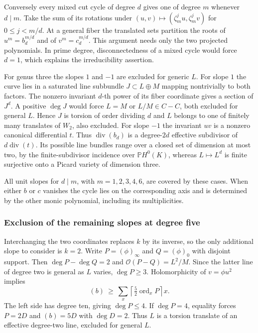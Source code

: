 Conversely every mixed cut cycle of degree $d$ gives one of degree $m$ whenever $d\mid m$. Take the sum of its rotations under $(u,v)\mapsto(\zeta_m^j u,\zeta_m^j v)$ for $0\le j<m/d$. At a general fiber the translated sets partition the roots of $u^m=b_d^{m/d}$ and of $v^m=c_d^{m/d}$. This argument needs only the two projected polynomials. In prime degree, disconnectedness of a mixed cycle would force $d=1$, which explains the irreducibility assertion.

For genus three the slopes $1$ and $-1$ are excluded for generic $L$. For slope $1$ the curve lies in a saturated line subbundle $J\subset L\oplus M$ mapping nontrivially to both factors. The nonzero invariant $d$-th power of its fiber coordinate gives a section of $J^d$. A positive $\deg J$ would force $L=M$ or $L/M\in C-C$, both excluded for general $L$. Hence $J$ is torsion of order dividing $d$ and $L$ belongs to one of finitely many translates of $W_2$, also excluded. For slope $-1$ the invariant $uv$ is a nonzero canonical differential $t$. Thus $\operatorname{div}(b_d)$ is a degree-$2d$ effective subdivisor of $d\operatorname{div}(t)$. Its possible line bundles range over a closed set of dimension at most two, by the finite-subdivisor incidence over $\mathbb P H^0(K)$, whereas $L\mapsto L^d$ is finite surjective onto a Picard variety of dimension three.  

All unit slopes for $d\mid m$, with $m=1,2,3,4,6$, are covered by these cases. When either $b$ or $c$ vanishes the cycle lies on the corresponding axis and is determined by the other monic polynomial, including its multiplicities.

\subsubsection{Exclusion of the remaining slopes at degree five}

Interchanging the two coordinates replaces $k$ by its inverse, so the only additional slope to consider is $k=2$. Write $P=(\phi)_\infty$ and $Q=(\phi)_0$ with disjoint support. Then $\deg P-\deg Q=2$ and $\mathcal O(P-Q)=L^2/M$. Since the latter line of degree two is general as $L$ varies, $\deg P\ge3$. Holomorphicity of $v=\phi u^2$ implies
\[
 (b)\ \ge\ \sum_x \left\lceil\tfrac52\operatorname{ord}_x P\right\rceil x .
\]
The left side has degree ten, giving $\deg P\le4$. If $\deg P=4$, equality forces $P=2D$ and $(b)=5D$ with $\deg D=2$. Thus $L$ is a torsion translate of an effective degree-two line, excluded for general $L$.

